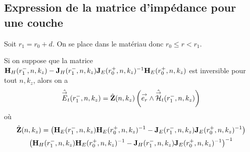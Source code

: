

  \subsection{Expression de la matrice d'impédance pour une couche}

    Soit \(r_1 = r_0 + d\). On se place dans le matériau donc \(r_0 \le r < r_1\).

    \begin{prop}
      Si on suppose que la matrice \(\mathbf{H}_{H}(r_1^-,n,k_z) - \mathbf{J}_{H}(r_1^-,n,k_z)\mathbf{J}_{E}(r_0^+,n,k_z)^{-1}\mathbf{H}_{E}(r_0^+,n,k_z)\) est inversible pour tout \(n,k_z\), alors on a 
      \begin{equation*}
        \hat {{\overset{\rightarrow}{E}}}_t(r_1^-,n,k_z) = \hat {\mathbf{Z}}(n,k_z) \left({\overset{\rightarrow}{e_r}}\wedge \hat {{\overset{\rightarrow}{\mathcal{H}}}}_t(r_1^-,n,k_z)\right)
      \end{equation*}
      où
      \begin{multline*}
        \hat {\mathbf{Z}}(n,k_z) =
        \left(\mathbf{H}_{E}(r_1^-,n,k_z)\mathbf{H}_{E}(r_0^+,n,k_z)^{-1} - \mathbf{J}_{E}(r_1^-,n,k_z)\mathbf{J}_{E}(r_0^+,n,k_z)^{-1}\right)\\
        \left(\mathbf{H}_{H}(r_1^-,n,k_z)\mathbf{H}_{E}(r_0^+,n,k_z)^{-1} - \mathbf{J}_{H}(r_1^-,n,k_z)\mathbf{J}_{E}(r_0^+,n,k_z)^{-1}\right)^{-1}
      \end{multline*}
    \end{prop}

